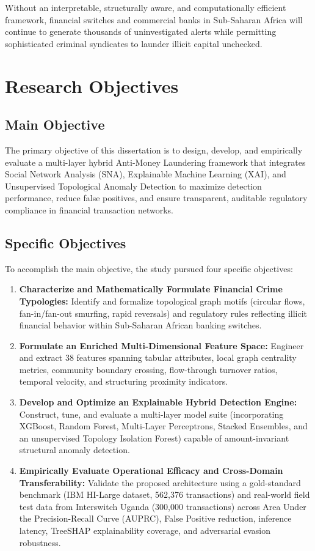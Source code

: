 Without an interpretable, structurally aware, and computationally efficient framework, financial switches and commercial banks in Sub-Saharan Africa will continue to generate thousands of uninvestigated alerts while permitting sophisticated criminal syndicates to launder illicit capital unchecked.

\section{Research Objectives}
\subsection{Main Objective}
The primary objective of this dissertation is to design, develop, and empirically evaluate a multi-layer hybrid Anti-Money Laundering framework that integrates Social Network Analysis (SNA), Explainable Machine Learning (XAI), and Unsupervised Topological Anomaly Detection to maximize detection performance, reduce false positives, and ensure transparent, auditable regulatory compliance in financial transaction networks.

\subsection{Specific Objectives}
To accomplish the main objective, the study pursued four specific objectives:
\begin{enumerate}
    \item[(i)] \textbf{Characterize and Mathematically Formulate Financial Crime Typologies:} Identify and formalize topological graph motifs (circular flows, fan-in/fan-out smurfing, rapid reversals) and regulatory rules reflecting illicit financial behavior within Sub-Saharan African banking switches.
    \item[(ii)] \textbf{Formulate an Enriched Multi-Dimensional Feature Space:} Engineer and extract 38 features spanning tabular attributes, local graph centrality metrics, community boundary crossing, flow-through turnover ratios, temporal velocity, and structuring proximity indicators.
    \item[(iii)] \textbf{Develop and Optimize an Explainable Hybrid Detection Engine:} Construct, tune, and evaluate a multi-layer model suite (incorporating XGBoost, Random Forest, Multi-Layer Perceptrons, Stacked Ensembles, and an unsupervised Topology Isolation Forest) capable of amount-invariant structural anomaly detection.
    \item[(iv)] \textbf{Empirically Evaluate Operational Efficacy and Cross-Domain Transferability:} Validate the proposed architecture using a gold-standard benchmark (IBM HI-Large dataset, 562,376 transactions) and real-world field test data from Interswitch Uganda (300,000 transactions) across Area Under the Precision-Recall Curve (AUPRC), False Positive reduction, inference latency, TreeSHAP explainability coverage, and adversarial evasion robustness.
\end{enumerate}

